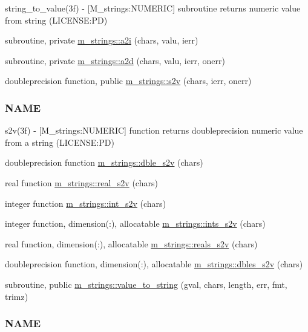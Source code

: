\begin{DoxyCompactItemize}
\begin{DoxyCompactList}
string\+\_\+to\+\_\+value(3f) -\/ \mbox{[}M\+\_\+strings\+:N\+U\+M\+E\+R\+IC\mbox{]} subroutine returns numeric value from string (L\+I\+C\+E\+N\+SE\+:PD) \end{DoxyCompactList}\item 
subroutine, private \mbox{\hyperlink{namespacem__strings_aca902af295ede82fb0c45174bbfe6eef}{m\+\_\+strings\+::a2i}} (chars, valu, ierr)
\item 
subroutine, private \mbox{\hyperlink{namespacem__strings_a8a18024e04cc697243355de3d61e171c}{m\+\_\+strings\+::a2d}} (chars, valu, ierr, onerr)
\item 
doubleprecision function, public \mbox{\hyperlink{namespacem__strings_ae0e2fe7c93e581402a74a7b59e5bb07f}{m\+\_\+strings\+::s2v}} (chars, ierr, onerr)
\begin{DoxyCompactList}\small\item\em \subsubsection*{N\+A\+ME}

s2v(3f) -\/ \mbox{[}M\+\_\+strings\+:N\+U\+M\+E\+R\+IC\mbox{]} function returns doubleprecision numeric value from a string (L\+I\+C\+E\+N\+SE\+:PD) \end{DoxyCompactList}\item 
doubleprecision function \mbox{\hyperlink{namespacem__strings_a970d99e3a2ab426bb90d6ea90bcc588a}{m\+\_\+strings\+::dble\+\_\+s2v}} (chars)
\item 
real function \mbox{\hyperlink{namespacem__strings_aac80fa95c07cf00d5442a88962c5e6e9}{m\+\_\+strings\+::real\+\_\+s2v}} (chars)
\item 
integer function \mbox{\hyperlink{namespacem__strings_aa94164439fc7659e175cf639e7315c0d}{m\+\_\+strings\+::int\+\_\+s2v}} (chars)
\item 
integer function, dimension(\+:), allocatable \mbox{\hyperlink{namespacem__strings_a4e54d205168cab37d25119d74a9ead63}{m\+\_\+strings\+::ints\+\_\+s2v}} (chars)
\item 
real function, dimension(\+:), allocatable \mbox{\hyperlink{namespacem__strings_ac62b68d2aeb2b404a3340101f2cb7f84}{m\+\_\+strings\+::reals\+\_\+s2v}} (chars)
\item 
doubleprecision function, dimension(\+:), allocatable \mbox{\hyperlink{namespacem__strings_ab463f9b431dd817b7b509608ec823b0f}{m\+\_\+strings\+::dbles\+\_\+s2v}} (chars)
\item 
subroutine, public \mbox{\hyperlink{namespacem__strings_a5dcd73626c8909c12f8ea29028927a88}{m\+\_\+strings\+::value\+\_\+to\+\_\+string}} (gval, chars, length, err, fmt, trimz)
\begin{DoxyCompactList}\small\item\em \subsubsection*{N\+A\+ME}


\end{DoxyCompactList}
\end{DoxyCompactItemize}
